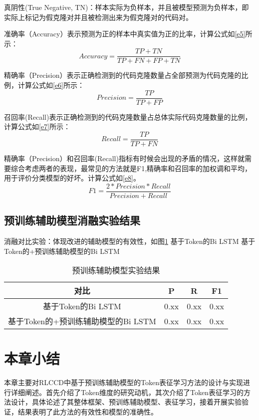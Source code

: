 真阴性(True Negative, TN)：样本实际为负样本，并且被模型预测为负样本，即实际上标记为假克隆对并且被检测出来为假克隆对的代码对。

准确率（Accuracy）表示预测为正的样本中真实值为正的比率，计算公式如\ref{e5}所示：
\begin{equation}\label{e5}
  Accuracy = \frac{TP+TN}{TP+FN+FP+TN} 
\end{equation}

精确率（Precision）表示正确检测到的代码克隆数量占全部预测为代码克隆的比例，计算公式如\ref{e6}所示：
\begin{equation}\label{e6}
  Precision = \frac{TP}{TP+FP} 
\end{equation}

召回率(Recall)表示正确检测到的代码克隆数量占总体实际代码克隆数量的比例，计算公式如\ref{e7}所示：
\begin{equation}\label{e7}
  Recall = \frac{TP}{TP+FN} 
\end{equation}

精确率（Precision）和召回率(Recall)指标有时候会出现的矛盾的情况，这样就需要综合考虑两者的表现，最常见的方法就是F1,精确率和召回率的加权调和平均，用于评价分类模型的好坏。计算公式如\ref{e8}。
\begin{equation}\label{e8}
  F1 = \frac{2*Precision*Recall}{Precision+Recall} 
\end{equation}

\subsection{预训练辅助模型消融实验结果}
消融对比实验：体现改进的辅助模型的有效性，如图\ref{tab:category}
基于Token的Bi LSTM
基于Token的+预训练辅助模型的Bi LSTM

\begin{table}[H]
  \centering
  \caption{预训练辅助模型实验结果} 
  \label{tab:category}
  \begin{tabular*}{0.8\textwidth}{@{\extracolsep{\fill}}cccc}
  \toprule
    对比			&P		&R		&F1 \\
  \midrule
    基于Token的Bi LSTM			&0.xx	&0.xx		&0.xx \\
    基于Token的+预训练辅助模型的Bi LSTM			&0.xx		&0.xx		&0.xx \\
  \bottomrule
  \end{tabular*}
\end{table}

\section{本章小结}
\label{sec:Summary3}
本章主要对RLCCD中基于预训练辅助模型的Token表征学习方法的设计与实现进行详细阐述。首先介绍了Token维度的研究动机，其次介绍了Token表征学习的方法设计，具体论述了其整体框架、预训练辅助模型、表征学习，接着开展实验验证，结果表明了此方法的有效性和模型的准确性。
